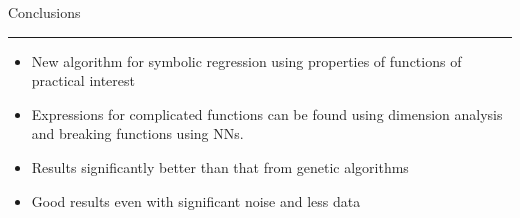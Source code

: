\documentclass[c,compress]{beamer}
\begin{document}
\begin{frame}{Conclusions\\\rule{10.5cm}{0.5pt}} \label{Conclusions}

\begin{itemize}
    \item New algorithm for symbolic regression using properties of functions of practical interest
    \item Expressions for complicated functions  can be found using dimension analysis and breaking functions using NNs.
    \item Results significantly better than that from genetic algorithms
    \item Good results even with significant noise and less data
\end{itemize}
\end{frame}
\end{document}
